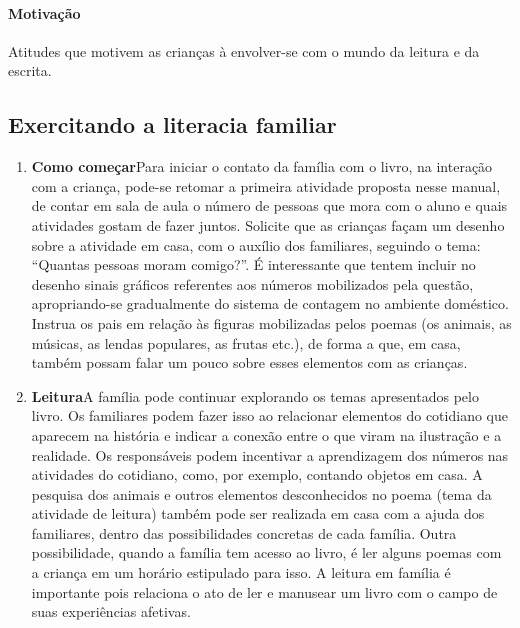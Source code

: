 \documentclass[11pt]{extarticle}
\begin{document}
\paragraph{Motivação} Atitudes que motivem as crianças à envolver-se com 
o mundo da leitura e da escrita.

\subsection{Exercitando a literacia familiar}


\begin{enumerate}
\item \textbf{Como começar}\quad Para iniciar o contato da família com o livro, na interação com a criança, pode-se retomar a primeira atividade proposta nesse manual, de contar em sala de aula o número de pessoas que mora com o aluno e quais atividades gostam de fazer juntos. Solicite que as crianças façam um desenho sobre a atividade em casa, com o auxílio dos familiares, seguindo o tema: ``Quantas pessoas moram comigo?''. É interessante que tentem incluir no desenho sinais gráficos referentes aos números mobilizados pela questão, apropriando-se gradualmente do sistema de contagem no ambiente doméstico. Instrua os pais em relação às figuras mobilizadas pelos poemas (os animais, as músicas, as lendas populares, as frutas etc.), de forma a que, em casa, também possam falar um pouco sobre esses elementos com as crianças.

\item \textbf{Leitura}\quad A família pode continuar 
explorando os temas apresentados pelo livro. Os familiares podem fazer isso ao relacionar 
elementos do cotidiano que aparecem na história e indicar a conexão 
entre o que viram na ilustração e a realidade. Os responsáveis podem incentivar a aprendizagem dos números nas atividades do cotidiano, como, por exemplo, contando objetos em casa. A pesquisa dos animais e outros elementos desconhecidos no poema (tema da atividade de leitura) também pode ser realizada em casa com a ajuda dos familiares, dentro das possibilidades concretas de cada família. Outra possibilidade, quando a família tem acesso ao livro, é ler alguns poemas com a criança em um horário estipulado para isso. A leitura em família é importante pois relaciona o ato de ler e manusear um livro com o campo de suas experiências afetivas.


\end{enumerate}
\end{document}
